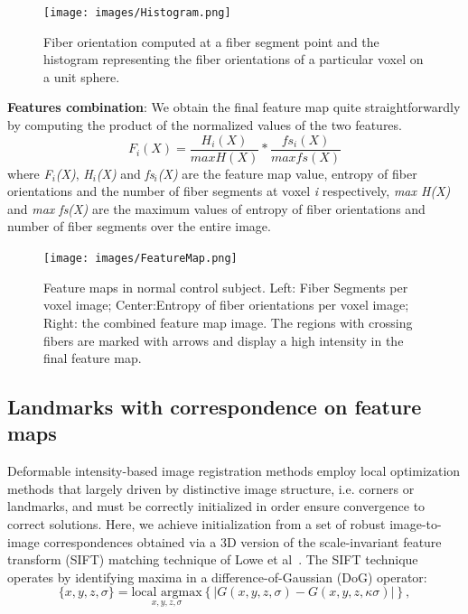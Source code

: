 \documentclass[]{spie}  %
\begin{document}
\begin{figure}[htb]
\label{fig:Histogram}
\texttt{[image: images/Histogram.png]}
\centering
\caption{Fiber orientation computed at a fiber segment point and the histogram representing the fiber orientations of a particular voxel on a unit sphere. }
\end{figure}

\textbf{Features combination}: We obtain the final  feature map quite straightforwardly  by computing the product of the normalized values of the two features.
\begin{equation}
F_i(X) = \frac{H_i(X)}{max H(X)} * \frac{fs_i(X)}{max fs(X)}
\end{equation}
where \textit{F$_i$(X)}, \textit{H$_i$(X)} and \textit{fs$_i$(X)} are the feature map value, entropy of fiber orientations and the number of fiber segments at voxel \textit{i} respectively, \textit{max H(X)} and \textit{max fs(X)} are the maximum values of entropy of fiber orientations and number of fiber segments over the entire image.

\begin{figure}[bt]
\label{fig:FeatureMap}
\texttt{[image: images/FeatureMap.png]}
\centering
\caption{Feature maps in normal control subject. Left: Fiber Segments per voxel image; Center:Entropy of fiber orientations per voxel image; Right: the combined feature map image. The  regions with crossing fibers are marked with arrows and display a high intensity in the final feature map.}
\end{figure}

\subsection{Landmarks with correspondence on feature maps}
\label{subsec:Correspondence}
Deformable intensity-based image registration methods employ local optimization methods that largely driven by distinctive image structure, i.e. corners or landmarks, and must be correctly initialized in order ensure convergence to correct solutions. Here, we achieve initialization from a set of robust image-to-image correspondences obtained via a 3D version of the scale-invariant feature transform (SIFT) matching technique of Lowe et al~\cite{Lowe:04}. The SIFT technique operates by identifying maxima in a difference-of-Gaussian (DoG) operator:
\begin{equation}
 \{x,y,z,\sigma\} = \underset{x,y,z,\sigma}{\mbox{local argmax}}\left\{|G(x,y,z,\sigma)-G(x,y,z,\kappa\sigma)|\right\},
\end{equation}
\end{document}
